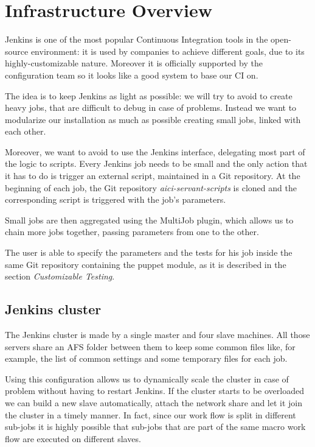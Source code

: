 \section{Infrastructure Overview}

Jenkins is one of the most popular Continuous Integration tools in the
open-source environment: it is used by companies to achieve different
goals, due to its highly-customizable nature. Moreover it is officially
supported by the configuration team so it looks like a good system to base
our CI on.

The idea is to keep Jenkins as light as possible: we will try to avoid to
create heavy jobs, that are difficult to debug in case of problems. Instead we
want to modularize our installation as much as possible creating small jobs,
linked with each other.

Moreover, we want to avoid to use the Jenkins interface, delegating most part
of the logic to scripts. Every Jenkins job needs to be small and the only
action that it has to do is trigger an external script, maintained in a Git
repository. At the beginning of each job, the Git repository
\textit{aici-servant-scripts} is cloned and the corresponding script is
triggered with the job's parameters.

Small jobs are then aggregated using the MultiJob plugin, which allows us to
chain more jobs together, passing parameters from one to the other.

The user is able to specify the parameters and the tests for his job inside the
same Git repository containing the puppet module, as it is described in the
section \textit{Customizable Testing}.

\subsection{Jenkins cluster}

The Jenkins cluster is made by a single master and four slave machines. All
those servers share an AFS folder between them to keep some common files like,
for example, the list of common settings and some temporary files for each job.

Using this configuration allows us to dynamically scale the cluster in case of
problem without having to restart Jenkins. If the cluster starts to be
overloaded we can build a new slave automatically, attach the network share and
let it join the cluster in a timely manner. In fact, since our work flow is
split in different sub-jobs it is highly possible that sub-jobs that are part
of the same macro work flow are executed on different slaves.

